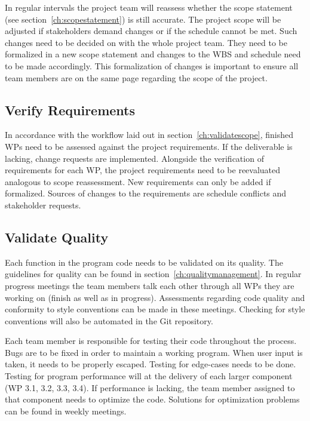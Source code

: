 In regular intervals the project team will reassess whether the scope statement (see section~\ref{ch:scopestatement}) is still accurate. The project scope will be adjusted if stakeholders demand changes or if the schedule cannot be met. Such changes need to be decided on with the whole project team. They need to be formalized in a new scope statement and changes to the \ac{WBS} and schedule need to be made accordingly. This formalization of changes is important to ensure all team members are on the same page regarding the scope of the project.

\subsection{Verify Requirements}
\label{ch:verifyrequirements}
In accordance with the workflow laid out in section~\ref{ch:validatescope}, finished \ac{WP}s need to be assessed against the project requirements. If the deliverable is lacking, change requests are implemented. Alongside the verification of requirements for each \ac{WP}, the project requirements need to be reevaluated analogous to scope reassessment. New requirements can only be added if formalized. Sources of changes to the requirements are schedule conflicts and stakeholder requests.

\subsection{Validate Quality}
\label{ch:validatequality}
Each function in the program code needs to be validated on its quality. The guidelines for quality can be found in section~\ref{ch:qualitymanagement}. In regular progress meetings the team members talk each other through all \ac{WP}s they are working on (finish as well as in progress). Assessments regarding code quality and conformity to style conventions can be made in these meetings. Checking for style conventions will also be automated in the Git repository.

Each team member is responsible for testing their code throughout the process. Bugs are to be fixed in order to maintain a working program. When user input is taken, it needs to be properly escaped. Testing for edge-cases needs to be done. Testing for program performance will at the delivery of each larger component (\ac{WP} 3.1, 3.2, 3.3, 3.4). If performance is lacking, the team member assigned to that component needs to optimize the code. Solutions for optimization problems can be found in weekly meetings.

